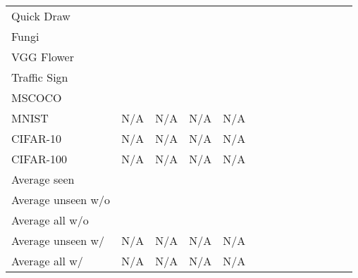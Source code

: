 \begin{table*}[t!]
{\begin{tabular}{lccccccccccccc}
    Quick Draw &\quad\;  &\quad\;  &\quad\;  &\quad\;  &\quad\;  &\quad\;  &\quad\;  &\quad\; \\
    Fungi &\quad\;  &\quad\;  &\quad\;  &\quad\;  &\quad\;  &\quad\;  &\quad\;  &\quad\; \\
    VGG Flower &\quad\;  &\quad\;  &\quad\;  &\quad\;  &\quad\;  &\quad\;  &\quad\;  &\quad\; \\
    Traffic Sign &\quad\;  &\quad\;  &\quad\;  &\quad\;  &\quad\;  &\quad\;  &\quad\;  &\quad\; \\
    MSCOCO &\quad\;  &\quad\;  &\quad\;  &\quad\;  &\quad\;  &\quad\;  &\quad\;  &\quad\; \\
    MNIST &\quad\; N/A &\quad\; N/A &\quad\; N/A &\quad\; N/A &\quad\;  &\quad\;  &\quad\;  &\quad\; \\
    CIFAR-10 &\quad\; N/A &\quad\; N/A &\quad\; N/A &\quad\; N/A &\quad\;  &\quad\;  &\quad\;  &\quad\; \\
    CIFAR-100 &\quad\; N/A &\quad\; N/A &\quad\; N/A &\quad\; N/A &\quad\;  &\quad\;  &\quad\;  &\quad\; \\
    \midrule
    Average seen &\quad\;  &\quad\;  &\quad\;  &\quad\;  &\quad\;  &\quad\;  &\quad\;  &\quad\; \\
    \midrule
    Average unseen w/o  &\quad\;  &\quad\;  &\quad\;  &\quad\;  &\quad\;  &\quad\;  &\quad\;  &\quad\; \\
    Average all w/o  &\quad\;  &\quad\;  &\quad\;  &\quad\;  &\quad\;  &\quad\;  &\quad\;  &\quad\; \\
    \midrule
    Average unseen w/  &\quad\; N/A &\quad\; N/A &\quad\; N/A &\quad\; N/A &\quad\;  &\quad\;  &\quad\;  &\quad\; \\
    Average all w/  &\quad\; N/A &\quad\; N/A &\quad\; N/A &\quad\; N/A &\quad\;  &\quad\;  &\quad\;  &\quad\; \\
    \bottomrule
  \end{tabular}
  }
  \label{tab:img_metadataset}
\end{table*}

